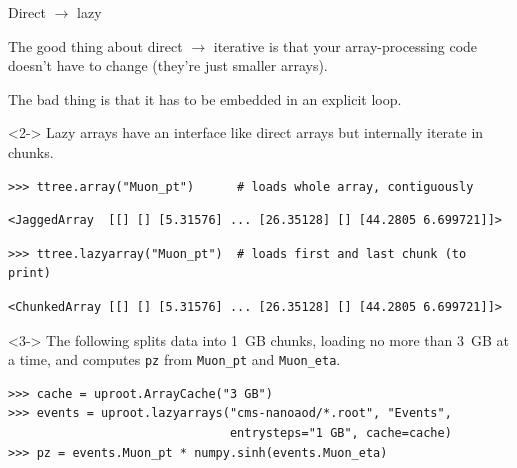 \documentclass[aspectratio=169]{beamer}
\begin{document}
\begin{frame}[fragile]{Direct $\to$ lazy}
\large
\vspace{0.25 cm}

The good thing about direct $\to$ iterative is that your array-processing code doesn't have to change (they're just smaller arrays).

\vspace{0.25 cm}
The bad thing is that it has to be embedded in an explicit loop.

\vspace{0.25 cm}
\begin{uncoverenv}<2->
Lazy arrays have an interface like direct arrays but internally iterate in chunks.

\small
\begin{verbatim}
>>> ttree.array("Muon_pt")      # loads whole array, contiguously
\end{verbatim}

\vspace{-0.4 cm}
\color{darkblue}\begin{verbatim}
<JaggedArray  [[] [] [5.31576] ... [26.35128] [] [44.2805 6.699721]]>
\end{verbatim}
\color{black}

\vspace{-0.4 cm}
\begin{verbatim}
>>> ttree.lazyarray("Muon_pt")  # loads first and last chunk (to print)
\end{verbatim}

\vspace{-0.4 cm}
\color{darkblue}\begin{verbatim}
<ChunkedArray [[] [] [5.31576] ... [26.35128] [] [44.2805 6.699721]]>
\end{verbatim}
\color{black}\large
\end{uncoverenv}

\begin{uncoverenv}<3->
The following splits data into 1~GB chunks, loading no more than 3~GB at a time, and computes \texttt{pz} from \texttt{Muon_pt} and \texttt{Muon_eta}.

\small
\begin{verbatim}
>>> cache = uproot.ArrayCache("3 GB")
>>> events = uproot.lazyarrays("cms-nanoaod/*.root", "Events",
                               entrysteps="1 GB", cache=cache)
>>> pz = events.Muon_pt * numpy.sinh(events.Muon_eta)
\end{verbatim}
\end{uncoverenv}
\end{frame}
\end{document}
